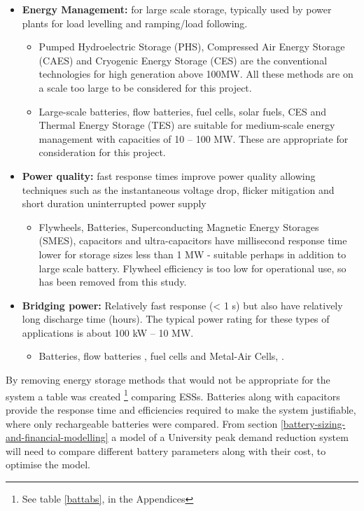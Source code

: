 \begin{itemize}
\tightlist
\item
  \textbf{Energy Management:} for large scale storage, typically used by
  power plants for load levelling and ramping/load following.

  \begin{itemize}
  \tightlist
  \item
    Pumped Hydroelectric Storage (PHS), Compressed Air Energy Storage
    (CAES) and Cryogenic Energy Storage (CES) are the conventional
    technologies for high generation above 100MW. All these methods are
    on a scale too large to be considered for this project.
  \item
    Large-scale batteries, flow batteries, fuel cells, solar fuels, CES
    and Thermal Energy Storage (TES) are suitable for medium-scale
    energy management with capacities of 10 -- 100 MW. These are
    appropriate for consideration for this project.
  \end{itemize}
\item
  \textbf{Power quality:} fast response times improve power quality
  allowing techniques such as the instantaneous voltage drop, flicker
  mitigation and short duration uninterrupted power supply

  \begin{itemize}
  \tightlist
  \item
    Flywheels, Batteries, Superconducting Magnetic Energy Storages
    (SMES), capacitors and ultra-capacitors have millisecond response
    time lower for storage sizes less than 1 MW - suitable perhaps in
    addition to large scale battery. Flywheel efficiency is too low for
    operational use, so has been removed from this study.
  \end{itemize}
\item
  \textbf{Bridging power:} Relatively fast response (\textless{} 1 s)
  but also have relatively long discharge time (hours). The typical
  power rating for these types of applications is about 100 kW -- 10 MW.

  \begin{itemize}
  \tightlist
  \item
    Batteries, flow batteries \cite{flowbatstan}, fuel cells and
    Metal-Air Cells\cite{Chen2009291}, \cite{batuni}.
  \end{itemize}
\end{itemize}

By removing energy storage methods that would not be appropriate for the
system a table was created
\footnote{See table \ref{battabs}, in the Appendices} comparing ESSs.
Batteries along with capacitors provide the response time
\cite{Choudar201521} and efficiencies required to make the system
justifiable, where only rechargeable batteries were compared. From
section \ref{battery-sizing-and-financial-modelling} a model of a
University peak demand reduction system will need to compare different
battery parameters along with their cost, to optimise the model.


